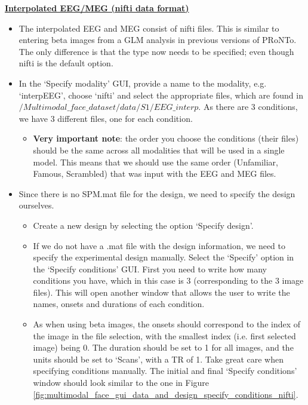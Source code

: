 \noindent \textbf{\underline{Interpolated EEG/MEG (nifti data format)}}

\begin{itemize}

\item The interpolated EEG and MEG consist of nifti files. This is similar to entering beta images from a GLM analysis in previous versions of PRoNTo. The only difference is that the type now needs to be specified; even though nifti is the default option.

\item In the `Specify modality' GUI, provide a name to the modality, e.g. `interpEEG', choose `nifti' and select the appropriate files, which are found in $/Multimodal\_face\_dataset/data/S1/EEG\_interp$. As there are 3 conditions, we have 3 different files, one for each condition.

\begin{itemize}
\item \noindent \textbf{Very important note}: the order you choose the conditions (their files) should be the same across all modalities that will be used in a single model. This means that we should use the same order (Unfamiliar, Famous, Scrambled) that was input with the EEG and MEG files.
\end{itemize}

\item Since there is no SPM.mat file for the design, we need to specify the design ourselves.

\begin{itemize}
\item Create a new design by selecting the option `Specify design'.
\item If we do not have a .mat file with the design information, we need to specify the experimental design manually. Select the `Specify' option in the `Specify conditions' GUI. First you need to write how many conditions you have, which in this case is 3 (corresponding to the 3 image files).  This will open another window that allows the user to write the names, onsets and durations of each condition.

\item As when using beta images, the onsets should correspond to the index of the image in the file selection, with the smallest index (i.e. first selected image) being 0. The duration should be set to 1 for all images, and the units should be set to `Scans', with a TR of 1. Take great care when specifying conditions manually. The initial and final `Specify conditions' window should look similar to the one in Figure \ref{fig:multimodal_face_gui_data_and_design_specify_conditions_nifti}.


\end{itemize}
\end{itemize}
